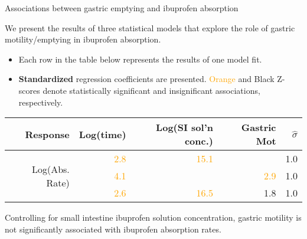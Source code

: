 \documentclass[handout]{beamer}
\begin{document}
\begin{frame}{Associations between gastric emptying and ibuprofen absorption}

\small

We present the results of three statistical models that explore the role of gastric motility/emptying in ibuprofen absorption.

\begin{itemize}
	\item Each row in the table below represents the results of one model fit.
	\item {\bf Standardized} regression coefficients are presented. \textcolor{orange}{Orange} and Black Z-scores denote statistically significant and insignificant associations, respectively. 
\end{itemize}

\footnotesize
\begin{table}[ht]
\centering
\begin{tabular}{r||rrr|r}
Response & Log(time) & Log(SI sol'n conc.) & Gastric Mot & $\hat{\sigma}$\\
\hline
\multirow{3}{*}{Log(Abs. Rate)} & \textcolor{orange}{2.8} & \textcolor{orange}{15.1} & & 1.0\\
 & \textcolor{orange}{4.1} &  & \textcolor{orange}{2.9} & 1.0\\
 & \textcolor{orange}{2.6} & \textcolor{orange}{16.5} & 1.8 & 1.0\\
\hline
\end{tabular}
\end{table}
\small

Controlling for small intestine ibuprofen solution concentration, gastric motility is not significantly associated with ibuprofen absorption rates.

\end{frame}
\end{document}
